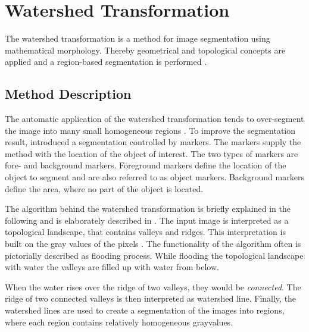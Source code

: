 
\section{Watershed Transformation}\label{ord:ch3:sec2}

The watershed transformation is a method for image segmentation using mathematical morphology. 
Thereby geometrical and topological concepts are applied and a region-based segmentation is performed \cite{VS91-Watershed} \cite{Beu00-Watersheds}.


\subsection{Method Description}\label{ord:ch3:sec2:subsec1}

The automatic application of the watershed transformation tends to over-segment the image into many small homogeneous regions \cite{Beu00-Watersheds}.
To improve the segmentation result, \cite{MS90-MorpologicalSegmentation} introduced a segmentation controlled by markers.
The markers supply the method with the location of the object of interest.
The two types of markers are fore- and background markers.
Foreground markers define the location of the object to segment and are also referred to as object markers.
Background markers define the area, where no part of the object is located.

The algorithm behind the watershed transformation is briefly explained in the following and is elaborately described in \cite{Beu00-Watersheds}.
The input image is interpreted as a topological landscape, that contains valleys and ridges.
This interpretation is built on the gray values of the pixels \cite{PB14-ImageAnalysis}.
The functionality of the algorithm often is pictorially described as flooding process.
While flooding the topological landscape with water the valleys are filled up with water from below.

When the water rises over the ridge of two valleys, they would be \textit{connected}. 
The ridge of two connected valleys is then interpreted as watershed line.
Finally, the watershed lines are used to create a segmentation of the images into regions, where each region contains relatively homogeneous grayvalues.

